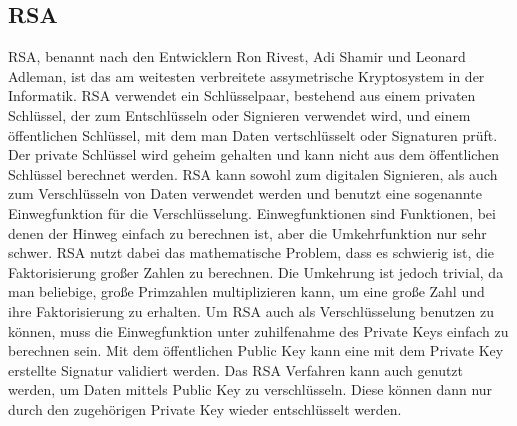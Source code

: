 \subsection{RSA}
\acs{RSA}, benannt nach den Entwicklern Ron Rivest, Adi Shamir und Leonard Adleman, ist das am weitesten verbreitete assymetrische Kryptosystem in der Informatik. \acs{RSA}  verwendet ein Schlüsselpaar, bestehend aus einem privaten Schlüssel, der zum Entschlüsseln oder Signieren verwendet wird, und einem öffentlichen Schlüssel, mit dem man Daten vertschlüsselt oder Signaturen prüft. Der private Schlüssel wird geheim gehalten und kann nicht aus dem öffentlichen Schlüssel berechnet werden. \acs{RSA} kann sowohl zum digitalen Signieren, als auch zum Verschlüsseln von Daten verwendet werden und benutzt eine sogenannte Einwegfunktion für die Verschlüsselung. Einwegfunktionen sind Funktionen, bei denen der Hinweg einfach zu berechnen ist, aber die Umkehrfunktion nur sehr schwer. \acs{RSA} nutzt dabei das mathematische Problem, dass es schwierig ist, die Faktorisierung großer Zahlen zu berechnen. Die Umkehrung ist jedoch trivial, da man beliebige, große Primzahlen multiplizieren kann, um eine große Zahl und ihre Faktorisierung zu erhalten. Um \acs{RSA} auch als Verschlüsselung benutzen zu können, muss die Einwegfunktion unter zuhilfenahme des Private Keys einfach zu berechnen sein. Mit dem öffentlichen Public Key kann eine mit dem Private Key erstellte Signatur validiert werden. Das \acs{RSA} Verfahren kann auch genutzt werden, um Daten mittels Public Key zu verschlüsseln. Diese können dann nur durch den zugehörigen Private Key wieder entschlüsselt werden. \cite[S.195, 200ff.]{1841202} \cite[S.433ff.]{548089}

